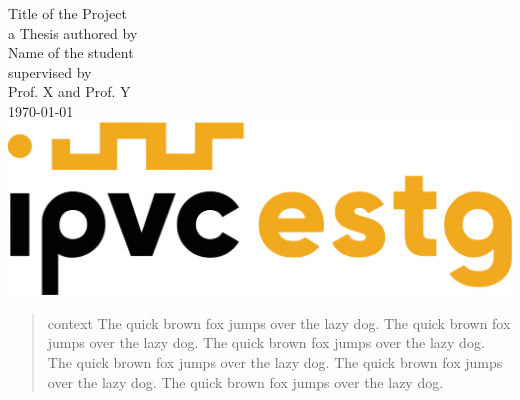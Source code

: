 \documentclass[11pt,a4paper]{report}
\begin{document}
\begin{titlepage}

\centering
\vspace{7cm}
\huge Title of the Project\\
\vspace{2cm}
\large a Thesis authored by\\
\Large Name of the student\\
\vspace{3cm}
\large supervised by\\
\large Prof. X and Prof. Y\\
\vspace{2cm}
\daymonthyear\today \\
\vspace{1cm}
\includegraphics[scale=0.4]{figs/ESTG-logo.png}
\end{titlepage}



\begin{abstract}
context
The quick brown fox jumps over the lazy dog. The quick brown fox jumps over the lazy dog. The quick brown fox jumps over the lazy dog. The quick brown fox jumps over the lazy dog. The quick brown fox jumps over the lazy dog. The quick brown fox jumps over the lazy dog.

\end{abstract}
\end{document}
